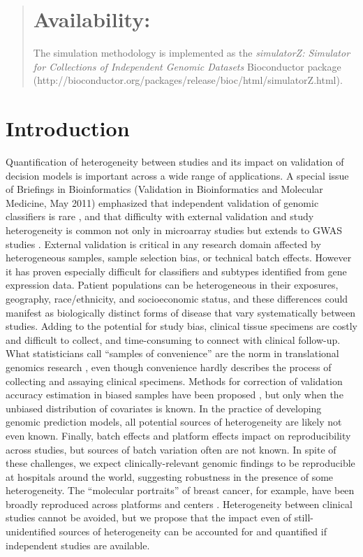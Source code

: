\documentclass{bioinfo}
\begin{document}
\begin{abstract}
  \section{Availability:} The simulation methodology is implemented as
  the \emph{simulatorZ: Simulator for Collections of Independent
    Genomic Datasets} Bioconductor package\\
  (http://bioconductor.org/packages/release/bioc/html/simulatorZ.html).
\end{abstract}

\section{Introduction}
Quantification of heterogeneity between studies and its impact on
validation of decision models is important across a wide range of
applications.  A special issue of Briefings in Bioinformatics
(Validation in Bioinformatics and Molecular Medicine, May 2011)
emphasized that independent validation of genomic classifiers is rare
\citep{Castaldi2011-dl}, and that difficulty with external validation
and study heterogeneity is common not only in microarray studies but
extends to GWAS studies \citep{Konig2011-el}.  External validation is
critical in any research domain affected by heterogeneous samples,
sample selection bias, or technical batch effects.  However it has
proven especially difficult for classifiers and subtypes identified
from gene expression data.  Patient populations can be heterogeneous in their
exposures, geography, race/ethnicity, and socioeconomic status, and
these differences could manifest as biologically distinct forms of
disease that vary systematically between studies.  Adding to the
potential for study bias, clinical tissue specimens are costly and
difficult to collect, and time-consuming to connect with clinical
follow-up.  What statisticians call ``samples of convenience'' are the
norm in translational genomics research \citep{Simon2009}, even though
convenience hardly describes the process of collecting and assaying
clinical specimens.  Methods for correction of validation accuracy
estimation in biased samples have been proposed \citep{Cortes2008},
but only when the unbiased distribution of covariates is known. In the
practice of developing genomic prediction models, all potential sources of
heterogeneity are likely not even known.  Finally, batch effects
\citep{Leek2010} and platform effects impact on reproducibility across
studies, but sources of batch variation often are not known.  In spite
of these challenges, we expect clinically-relevant genomic findings to
be reproducible at hospitals around the world, suggesting robustness
in the presence of some heterogeneity.  The ``molecular portraits'' of
breast cancer, for example, have been broadly reproduced across
platforms and centers \citep{Hu2006}.  Heterogeneity between clinical
studies cannot be avoided, but we propose that the impact even of
still-unidentified sources of heterogeneity can be accounted for and
quantified if independent studies are available.
\end{document}
